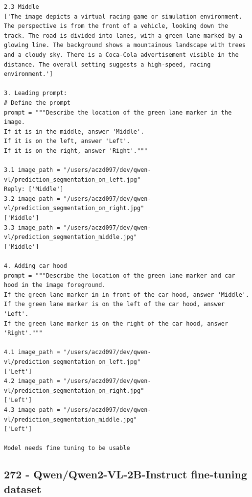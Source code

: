 \begin{verbatim}
2.3 Middle
['The image depicts a virtual racing game or simulation environment. The perspective is from the front of a vehicle, looking down the track. The road is divided into lanes, with a green lane marked by a glowing line. The background shows a mountainous landscape with trees and a cloudy sky. There is a Coca-Cola advertisement visible in the distance. The overall setting suggests a high-speed, racing environment.']

3. Leading prompt:
# Define the prompt
prompt = """Describe the location of the green lane marker in the image.
If it is in the middle, answer 'Middle'.
If it is on the left, answer 'Left'.
If it is on the right, answer 'Right'."""

3.1 image_path = "/users/aczd097/dev/qwen-vl/prediction_segmentation_on_left.jpg"
Reply: ['Middle']
3.2 image_path = "/users/aczd097/dev/qwen-vl/prediction_segmentation_on_right.jpg"
['Middle']
3.3 image_path = "/users/aczd097/dev/qwen-vl/prediction_segmentation_middle.jpg"
['Middle']

4. Adding car hood
prompt = """Describe the location of the green lane marker and car hood in the image foreground.
If the green lane marker in in front of the car hood, answer 'Middle'.
If the green lane marker is on the left of the car hood, answer 'Left'.
If the green lane marker is on the right of the car hood, answer 'Right'."""

4.1 image_path = "/users/aczd097/dev/qwen-vl/prediction_segmentation_on_left.jpg"
['Left']
4.2 image_path = "/users/aczd097/dev/qwen-vl/prediction_segmentation_on_right.jpg"
['Left']
4.3 image_path = "/users/aczd097/dev/qwen-vl/prediction_segmentation_middle.jpg"
['Left']

Model needs fine tuning to be usable

\end{verbatim}

\subsection{272 - Qwen/Qwen2-VL-2B-Instruct fine-tuning dataset}
\label{app_res:272}

